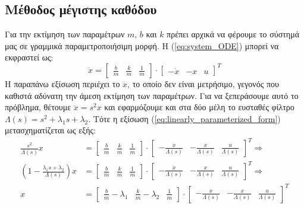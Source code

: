 \documentclass[a4paper,12pt]{article}
\begin{document}
\subsection*{Μέθοδος μέγιστης καθόδου}
Για την εκτίμηση των παραμέτρων $m$, $b$ και $k$ πρέπει αρχικά να φέρουμε το σύστημά μας σε γραμμικά
παραμετροποιήσιμη μορφή. Η (\ref{eq:system_ODE}) μπορεί να εκφραστεί ως:
\begin{equation}
    \ddot{x} = 
    \begin{bmatrix}
        \frac{b}{m} & \frac{k}{m} & \frac{1}{m}
    \end{bmatrix} \cdot
    \begin{bmatrix}
        -\dot{x} & -x & u
    \end{bmatrix}^T
    \label{eq:linearly_parameterized_form}
\end{equation}
Η παραπάνω εξίσωση περιέχει το $\ddot{x}$, το οποίο δεν είναι μετρήσιμο, γεγονός που καθιστά αδύνατη την άμεση 
εκτίμηση των παραμέτρων. Για να ξεπεράσουμε αυτό το πρόβλημα, θέτουμε $\ddot{x} = s^2x$ και εφαρμόζουμε 
και στα δύο μέλη το ευσταθές φίλτρο $\Lambda(s) = s^2 + \lambda_1 s + \lambda_2$. Τότε η εξίσωση 
(\ref{eq:linearly_parameterized_form}) μετασχηματίζεται ως εξής:
\begin{equation*}
    \begin{aligned}
        \frac{s^2}{\Lambda(s)}x &= 
        \begin{bmatrix}
            \frac{b}{m} & \frac{k}{m} & \frac{1}{m}
        \end{bmatrix} \cdot
        \begin{bmatrix}
            -\frac{\dot{x}}{\Lambda(s)} & -\frac{x}{\Lambda(s)} & \frac{u}{\Lambda(s)}
        \end{bmatrix}^T 
        \Rightarrow \\
        \left(1 - \frac{\lambda_1 s + \lambda_2}{\Lambda(s)}\right)x &= 
        \begin{bmatrix}
            \frac{b}{m} & \frac{k}{m} & \frac{1}{m}
        \end{bmatrix} \cdot
        \begin{bmatrix}
            -\frac{\dot{x}}{\Lambda(s)} & -\frac{x}{\Lambda(s)} & \frac{u}{\Lambda(s)}
        \end{bmatrix}^T 
        \Rightarrow \\
        x &= 
        \begin{bmatrix}
            \frac{b}{m} - \lambda_1 & \frac{k}{m} - \lambda_2 & \frac{1}{m}
        \end{bmatrix} \cdot
        \begin{bmatrix}
            -\frac{\dot{x}}{\Lambda(s)} & -\frac{x}{\Lambda(s)} & \frac{u}{\Lambda(s)}
        \end{bmatrix}^T 
    \end{aligned}
\end{equation*}
\end{document}
